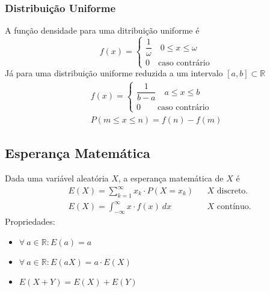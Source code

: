 \documentclass{article}
\begin{document}
\subsubsection{Distribuição Uniforme}
A função densidade para uma ditribuição uniforme é
\[
  f(x) = \begin{cases}
          \dfrac{1}{\omega} \quad 0 \leq x \leq \omega \\[10pt]
          0 \quad \text{caso contrário}
         \end{cases}
\]
Já para uma distribuição uniforme reduzida a um intervalo $[a,b] \subset \mathbb{R}$
\begin{gather*}
  f(x) = \begin{cases}
          \dfrac{1}{b - a} \quad a \leq x \leq b \\[10pt]
          0 \qquad \text{caso contrário}
         \end{cases} \\[10pt]
  P(m \leq x \leq n) = f(n) - f(m)
\end{gather*}

\pagebreak

\subsection{Esperança Matemática}
Dada uma variável aleatória $X$, a esperança matemática de $X$ é
\begin{align*}
  & E(X) = \sum_{k=1}^{\infty} x_k \cdot P(X = x_k) && \text{$X$ discreto.} \\[5pt]
  & E(X) = \int_{-\infty}^{\infty} x \cdot f(x) \: dx && \text{$X$ contínuo.}
\end{align*}
Propriedades:
\begin{itemize}
  \item $\forall\: a \in \mathbb{R}: E(a) = a$
  \item $\forall\: a \in \mathbb{R}: E(aX) = a \cdot E(X)$
  \item $E(X + Y) = E(X) + E(Y)$
\end{itemize}
\end{document}
